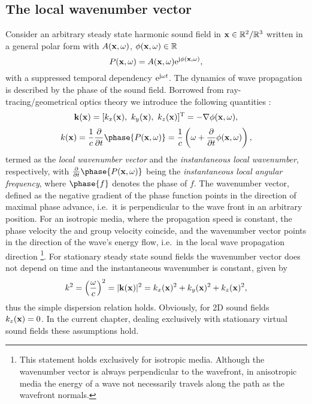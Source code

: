 \subsection{The local wavenumber vector}
Consider an arbitrary steady state harmonic sound field in $\mathbf{x} \in \mathbb{R}^2 / \mathbb{R}^3$ written in a general polar form with $A(\mathbf{x},\omega)$, $\phi(\mathbf{x},\omega) \in \mathbb{R}$
\begin{equation}
P(\mathbf{x},\omega) = A(\mathbf{x},\omega)\mathrm{e}^{\mathrm{j} \phi(\mathbf{x},\omega)},
\label{eq:25D_WFS:general_sf}
\end{equation}
%
with a suppressed temporal dependency $\mathrm{e}^{\mathrm{j} \omega t}$.
The dynamics of wave propagation is described by the phase of the sound field.
Borrowed from ray-tracing/geometrical optics theory we introduce the following quantities \cite{Romer2005,Carozzi2004}:
%
\begin{equation}
\vk(\vx) = [k_x(\vx),\ k_y(\vx),\ k_z(\vx)]^{\mathrm{T}} = -\nabla \phi(\vx,\omega),
\end{equation}
%
\begin{equation}
k(\vx) =  \frac{1}{c} \frac{\partial}{\partial t} \phase{P(\vx,\omega)}  = \frac{1}{c} \left( \omega + \frac{\partial}{\partial t} \phi(\vx,\omega) \right),
\end{equation}
%
termed as the \emph{local wavenumber vector} and the \emph{instantaneous local wavenumber}, respectively, with $ \frac{\partial}{\partial t} \phase{P(\vx,\omega)} $ being the \emph{instantaneous local angular frequency}, where $\phase{f}$ denotes the phase of $f$.
The wavenumber vector, defined as the negative gradient of the phase function points in the direction of maximal phase advance, i.e.\ it is perpendicular to the wave front in an arbitrary position.
For an isotropic media, where the propagation speed is constant, the phase velocity the and group velocity coincide, and the wavenumber vector points in the direction of the wave's energy flow, i.e.\ in the local wave propagation direction \footnote{This statement holds exclusively for isotropic media.
Although the wavenumber vector is always perpendicular to the wavefront, in anisotropic media the energy of a wave not necessarily travels along the path as the wavefront normals\cite{Pollard1977}.}.
For stationary steady state sound fields the wavenumber vector does not depend on time and the instantaneous wavenumber is constant, given by 
\begin{equation}
k^2 = \left( \frac{\omega}{c} \right)^2 = |\mathbf{k}(\mathbf{x})|^2 = k_x(\mathbf{x})^2 + k_y(\mathbf{x})^2 + k_z(\mathbf{x})^2,
\end{equation}
thus the simple dispersion relation holds.
Obviously, for 2D sound fields $k_z(\mathbf{x})=0$.
In the current chapter, dealing exclusively with stationary virtual sound fields these assumptions hold.

